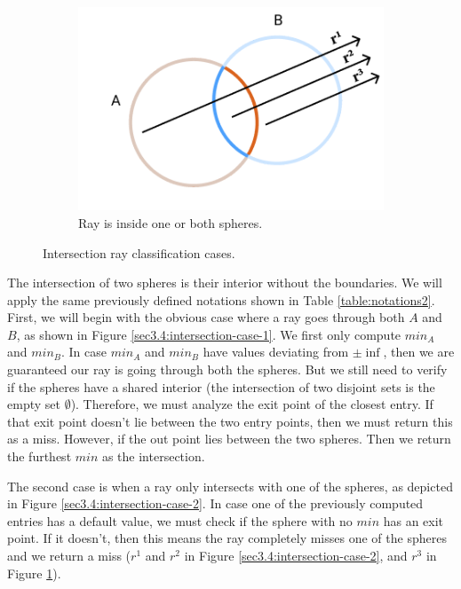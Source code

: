 \documentclass[a4paper,11pt,oneside]{article}
\begin{document}
\begin{figure}[ht]
\begin{subfigure}[b]{0.3\textwidth}
         \includegraphics[width=\textwidth]{section3/3.4/intersection-case-3.png}
         \caption{Ray is inside one or both spheres.}
         \label{sec3.4:intersection-case-3}
     \end{subfigure}
        \caption{Intersection ray classification cases.}
        \label{sec3.4:sphere-intersection}
\end{figure}

The intersection of two spheres is their interior without the boundaries. We will apply the same previously defined notations shown in Table \ref{table:notations2}. First, we will begin with the obvious case where a ray goes through both $A$ and $B$, as shown in Figure \ref{sec3.4:intersection-case-1}. We first only compute $min_A$ and $min_B$. In case $min_A$ and $min_B$ have values deviating from $\pm\inf$, then we are guaranteed our ray is going through both the spheres. But we still need to verify if the spheres have a shared interior (the intersection of two disjoint sets is the empty set $\emptyset$). Therefore, we must analyze the exit point of the closest entry. If that exit point doesn't lie between the two entry points, then we must return this as a miss. However, if the out point lies between the two spheres. Then we return the furthest $min$ as the intersection. 

The second case is when a ray only intersects with one of the spheres, as depicted in Figure \ref{sec3.4:intersection-case-2}. In case one of the previously computed entries has a default value, we must check if the sphere with no $min$ has an exit point. If it doesn't, then this means the ray completely misses one of the spheres and we return a miss ($r^1$ and $r^2$ in Figure \ref{sec3.4:intersection-case-2}, and $r^3$ in Figure \ref{sec3.4:intersection-case-3}). 
\end{document}
